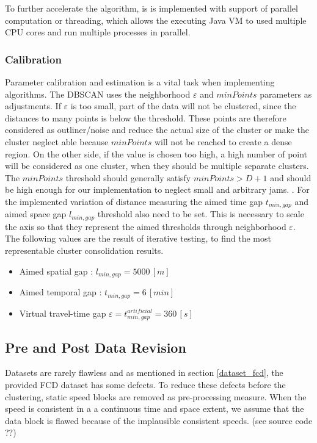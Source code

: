 
To further accelerate the algorithm, is is implemented with support of parallel computation or threading, which allows the executing Java VM to used multiple CPU cores and run multiple processes in parallel.

\subsubsection{Calibration}
Parameter calibration and estimation is a vital task when implementing algorithms. The DBSCAN uses the neighborhood $\varepsilon$ and $minPoints$ parameters as adjustments. If $\varepsilon$ is too small, part of the data will not be clustered, since the distances to many points is below the threshold. These points are therefore considered as outliner/noise and reduce the actual size of the cluster or make the cluster neglect able because $minPoints$ will not be reached to create a dense region. On the other side, if the value is chosen too high, a high number of point will be considered as one cluster, when they should be multiple separate clusters. The $minPoints$ threshold should generally satisfy $minPoints > D + 1$ and should be high enough for our implementation to neglect small and arbitrary jams. \parencite{Padro2017}. For the implemented variation of distance measuring the aimed time gap $t_{min,gap}$ and aimed space gap $l_{min,gap}$ threshold also need to be set. This is necessary to scale the axis so that they represent the aimed thresholds through neighborhood $\varepsilon$. The following values are the result of iterative testing, to find the most representable cluster consolidation results. 

\begin{itemize}
	\item Aimed spatial gap : $l_{min,gap} = 5000 \,[m]$
	\item Aimed temporal gap : $t_{min,gap} = 6 \,[min]$
	\item Virtual travel-time gap $\varepsilon = t_{min,gap}^{artificial} = 360 \,[s]$
\end{itemize}

\subsection{Pre and Post Data Revision}
Datasets are rarely flawless and as mentioned in section \ref{dataset_fcd}, the provided FCD dataset has some defects. To reduce these defects before the clustering, static speed blocks are removed as pre-processing measure. When the speed is consistent in a a continuous time and space extent, we assume that the data block is flawed because of the implausible consistent speeds. (see source code ??) 

